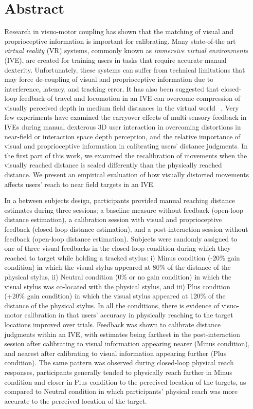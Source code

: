 \chapter*{Abstract}
Research in visuo-motor coupling has shown that the matching of visual and proprioceptive information is important for calibrating. Many state-of-the art \textit{virtual reality} (VR) systems, commonly known as \textit{immersive virtual environments} (IVE), are created for training users in tasks that require accurate manual dexterity. Unfortunately, these systems can suffer from technical limitations that may force de-coupling of visual and proprioceptive information due to interference, latency, and tracking error. It has also been suggested that closed-loop feedback of travel and locomotion in an IVE can overcome compression of visually perceived depth in medium field distances in the virtual world ~\cite{KCT13,MCT06}. Very few experiments have examined the carryover effects of multi-sensory feedback in IVEs during manual dexterous 3D user interaction in overcoming distortions in near-field or interaction space depth perception, and the relative importance of visual and proprioceptive information in calibrating users’ distance judgments. In the first part of this work, we examined the recalibration of movements when the visually reached distance is scaled differently than the physically reached distance. We present an empirical evaluation of how visually distorted movements affects users' reach to near field targets %
in an IVE. 

In a between subjects design, participants provided manual reaching distance estimates during three sessions; a baseline measure without feedback (open-loop distance estimation), a calibration session with visual and proprioceptive feedback (closed-loop distance estimation), and a post-interaction session without feedback (open-loop distance estimation). Subjects were randomly assigned to one of three visual feedbacks in the closed-loop condition during which they reached to target while holding a tracked stylus: i) Minus condition (-20\% gain condition) in which the visual stylus appeared at 80\% of the distance of the physical stylus, ii) Neutral condition (0\% or no gain condition) in which the visual stylus was co-located with the physical stylus, and iii) Plus condition (+20\% gain condition) in which the visual stylus appeared at 120\% of the distance of the physical stylus. In all the conditions, there is evidence of visuo-motor calibration in that users' accuracy in physically reaching to the target locations improved over trials. Feedback was shown to calibrate distance judgments within an IVE, with estimates being farthest in the post-interaction session after calibrating to visual information appearing nearer (Minus condition), and nearest after calibrating to visual information appearing further (Plus condition). The same pattern was observed during closed-loop physical reach responses, participants generally tended to physically reach farther in Minus condition and closer in Plus condition to the perceived location of the targets, as compared to Neutral condition in which participants' physical reach was more accurate to the perceived location of the target.
 
